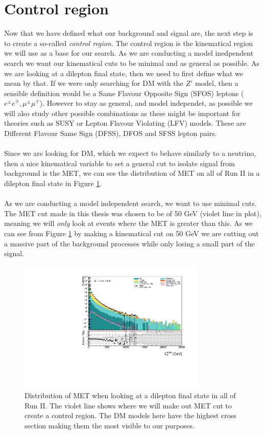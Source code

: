 \documentclass[12pt, a4paper]{book}
\begin{document}
\section{Control region}
Now that we have defined what our background and signal are, the next step is to create a so-called \textit{control region}. The control region is the kinematical region we will use as a base for our search. As we are conducting a model inedpendent search we want 
our kinematical cuts to be minimal and as general as possible. As we are looking at a dilepton final state, then we need to first define what we mean by that. If we were only searching for DM with the $Z'$ model, then a sensible definition would be a 
Same Flavour Opposite Sign (SFOS) leptons ($e^\pm e^\mp, \mu^\pm\mu^\mp$). However to stay as general, and model independet, as possible we will also study other possible combinations as these might be important for theories such as SUSY or Lepton Flavour Violating 
(LFV) models. These are Different Flavour Same Sign (DFSS), DFOS and SFSS lepton pairs.\\
\\Since we are looking for DM, which we expect to behave similarly to a neutrino, then a nice kinematical variable to set a general cut to isolate signal from background is the MET, we can see the 
distribution of MET on all of Run II in a dilepton final state in Figure \ref{fig:uncut_met}.\\
\\As we are conducting a model independent search, we want to use minimal cuts. The MET cut made in this thesis was chosen to be of 50 GeV (violet line in plot), meaning we will \textit{only} look at events where the MET is greater than this. As we can see from Figure \ref{fig:uncut_met} 
by making a kinematical cut on 50 GeV we are cutting out a massive part of the background processes while only losing a small part of the signal. \\
\graphicspath{{../../../Plots/Data_Analysis/SRs/Uncut/}} 
\begin{figure}[!ht]
    \centering
    \includegraphics[width=0.8\textwidth]{met.pdf}
    \caption[$E_T^{miss}$ distribution in dilepton final state Run II]{Distribution of MET when looking at a dilepton final state in all of Run II. The violet line shows where we will make out MET cut to create a control region. The DM models here have the highest cross section making them the most visible to our purposes.}\label{fig:uncut_met}
\end{figure}
\end{document}
